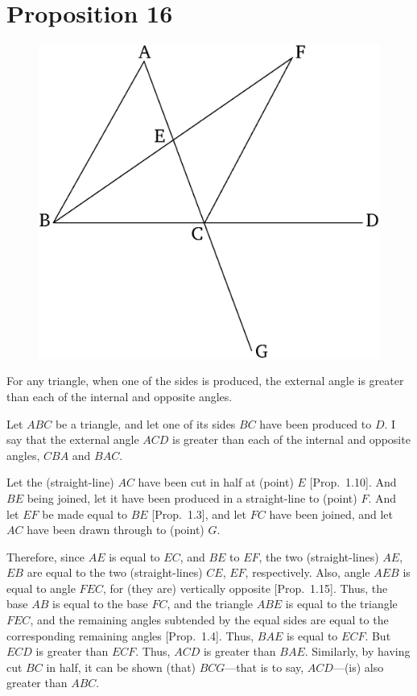 \chapter*{Proposition 16}
\label{prop:16}

\begin{figure}[ht]
    \begin{center}
    \includegraphics[width=0.5\linewidth]{figures/fig16e.eps}
    \label{fig:prop_16}
    \end{center}
\end{figure}

For any triangle, when one of the sides is produced, the external angle
is greater than each of the internal and opposite angles.

Let $ABC$ be a triangle, and let one of its sides $BC$ have been produced 
 to $D$. I say that the external angle $ACD$ is greater than each of the
 internal and opposite angles, $CBA$ and $BAC$.
 
Let the (straight-line) $AC$ have been cut in half at (point) $E$ [Prop.~1.10].
 And $BE$ being joined, let it have been produced in a straight-line to
 (point) $F$. And let $EF$ be made equal to $BE$ [Prop.~1.3], and let $FC$ have been joined, and let $AC$ have been drawn through to (point) $G$.

Therefore, since $AE$ is equal to $EC$, and $BE$ to $EF$, the two (straight-lines)
 $AE$, $EB$ are equal to the two (straight-lines) $CE$, $EF$, respectively. 
 Also, angle $AEB$ is equal to angle $FEC$, for (they are)
 vertically opposite [Prop.~1.15]. Thus, the base $AB$ is equal to the base
 $FC$, and the triangle $ABE$ is equal to the triangle $FEC$, and the remaining
 angles subtended by the equal sides are equal to the corresponding remaining angles [Prop.~1.4]. Thus, $BAE$ is equal to $ECF$. But $ECD$ is greater than $ECF$. Thus,
 $ACD$ is greater than $BAE$. Similarly, by having cut $BC$ in half,  it can  be shown (that) $BCG$---that is to say, $ACD$---(is) also greater than $ABC$.
 
